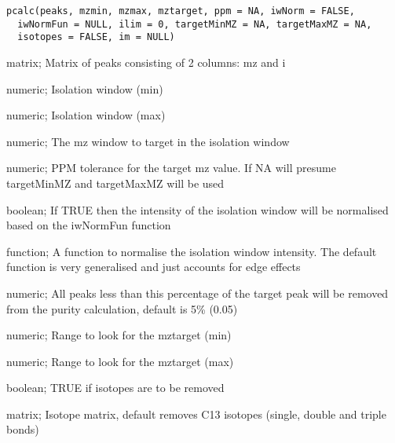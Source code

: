 \documentclass[letterpaper]{book}
\begin{document}
%
\begin{Usage}
\begin{verbatim}
pcalc(peaks, mzmin, mzmax, mztarget, ppm = NA, iwNorm = FALSE,
  iwNormFun = NULL, ilim = 0, targetMinMZ = NA, targetMaxMZ = NA,
  isotopes = FALSE, im = NULL)
\end{verbatim}
\end{Usage}
%
\begin{Arguments}
\begin{ldescription}
\item[\code{peaks}] matrix; Matrix of peaks consisting of 2 columns: mz and i

\item[\code{mzmin}] numeric; Isolation window (min)

\item[\code{mzmax}] numeric; Isolation window (max)

\item[\code{mztarget}] numeric; The mz window to target in the isolation window

\item[\code{ppm}] numeric; PPM tolerance for the target mz value. If NA will presume targetMinMZ and targetMaxMZ will be used

\item[\code{iwNorm}] boolean; If TRUE then the intensity of the isolation window will be normalised based on the iwNormFun function

\item[\code{iwNormFun}] function; A function to normalise the isolation window intensity. The default function is very generalised and just accounts for edge effects

\item[\code{ilim}] numeric; All peaks less than this percentage of the target peak will be removed from the purity calculation, default is 5\% (0.05)

\item[\code{targetMinMZ}] numeric; Range to look for the mztarget (min)

\item[\code{targetMaxMZ}] numeric; Range to look for the mztarget (max)

\item[\code{isotopes}] boolean; TRUE if isotopes are to be removed

\item[\code{im}] matrix; Isotope matrix, default removes C13 isotopes (single, double and triple bonds)
\end{ldescription}
\end{Arguments}
\end{document}
